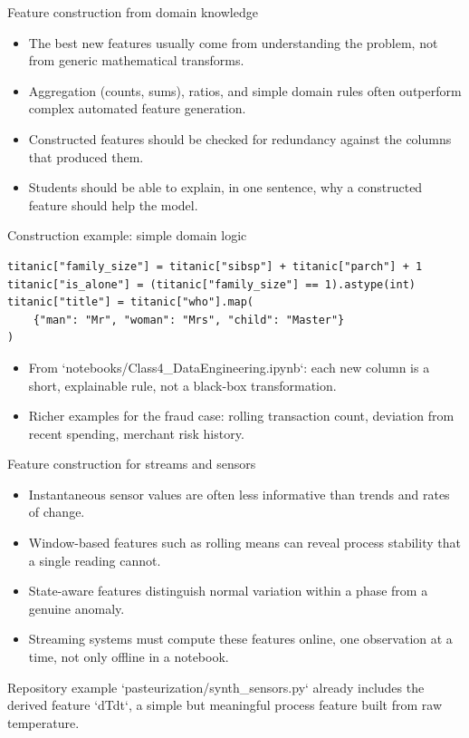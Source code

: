 \begin{frame}{Feature construction from domain knowledge}
\begin{itemize}
\item The best new features usually come from understanding the problem, not from generic mathematical transforms.
\item Aggregation (counts, sums), ratios, and simple domain rules often outperform complex automated feature generation.
\item Constructed features should be checked for redundancy against the columns that produced them.
\item Students should be able to explain, in one sentence, why a constructed feature should help the model.
\end{itemize}
\coursefooter
\end{frame}

\begin{frame}[fragile]{Construction example: simple domain logic}
\begin{lstlisting}[style=coursepython]
titanic["family_size"] = titanic["sibsp"] + titanic["parch"] + 1
titanic["is_alone"] = (titanic["family_size"] == 1).astype(int)
titanic["title"] = titanic["who"].map(
    {"man": "Mr", "woman": "Mrs", "child": "Master"}
)
\end{lstlisting}
\begin{itemize}
\item From `notebooks/Class4_DataEngineering.ipynb`: each new column is a short, explainable rule, not a black-box transformation.
\item Richer examples for the fraud case: rolling transaction count, deviation from recent spending, merchant risk history.
\end{itemize}
\coursefooter
\end{frame}

\begin{frame}{Feature construction for streams and sensors}
\begin{itemize}
\item Instantaneous sensor values are often less informative than trends and rates of change.
\item Window-based features such as rolling means can reveal process stability that a single reading cannot.
\item State-aware features distinguish normal variation within a phase from a genuine anomaly.
\item Streaming systems must compute these features online, one observation at a time, not only offline in a notebook.
\end{itemize}
\begin{block}{Repository example}
`pasteurization/synth_sensors.py` already includes the derived feature `dTdt`, a simple but meaningful process feature built from raw temperature.
\end{block}
\coursefooter
\end{frame}

